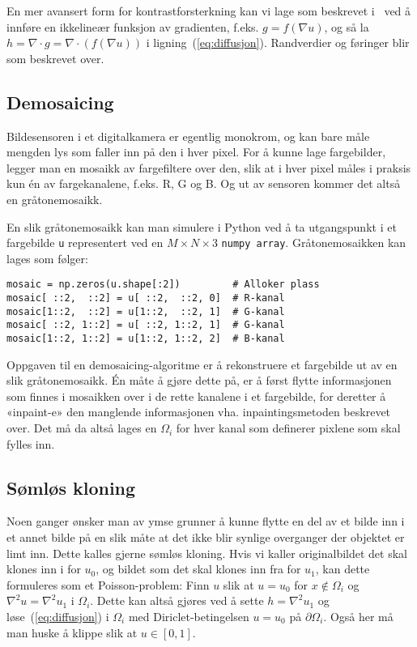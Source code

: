 \documentclass[11pt,a4paper]{article}
\begin{document}
En mer avansert form for kontrastforsterkning kan vi lage som
beskrevet i~\cite{Fattal:02} ved å innføre en ikkelineær funksjon av
gradienten, f.eks. $g = f(\nabla u)$, og så la
$h = \nabla\cdot g = \nabla\cdot(f(\nabla u))$ i
ligning~(\ref{eq:diffusjon}). Randverdier og føringer blir som
beskrevet over.

\subsection{Demosaicing}
\label{sec:utvidelse_1}

Bildesensoren i et digitalkamera er egentlig monokrom, og kan bare
måle mengden lys som faller inn på den i hver pixel. For å kunne lage
fargebilder, legger man en mosaikk av fargefiltere over den, slik at i
hver pixel måles i praksis kun én av fargekanalene, f.eks. R, G og B.
Og ut av sensoren kommer det altså en gråtonemosaikk.

En slik gråtonemosaikk kan man simulere i Python ved å ta utgangspunkt
i et fargebilde \texttt{u} representert ved en $M\times N \times 3$
\texttt{numpy array}. Gråtonemosaikken kan lages som følger:
\begin{lstlisting}
mosaic = np.zeros(u.shape[:2])         # Alloker plass
mosaic[ ::2,  ::2] = u[ ::2,  ::2, 0]  # R-kanal
mosaic[1::2,  ::2] = u[1::2,  ::2, 1]  # G-kanal
mosaic[ ::2, 1::2] = u[ ::2, 1::2, 1]  # G-kanal
mosaic[1::2, 1::2] = u[1::2, 1::2, 2]  # B-kanal
\end{lstlisting}

Oppgaven til en demosaicing-algoritme er å rekonstruere et fargebilde
ut av en slik gråtonemosaikk. Én måte å gjøre dette på, er å først
flytte informasjonen som finnes i mosaikken over i de rette kanalene i
et fargebilde, for deretter å «inpaint-e» den manglende informasjonen
vha. inpaintingsmetoden beskrevet over. Det må da altså lages en
$\Omega_i$ for hver kanal som definerer pixlene som skal fylles inn.

\subsection{Sømløs kloning}

Noen ganger ønsker man av ymse grunner å kunne flytte en del av et
bilde inn i et annet bilde på en slik måte at det ikke blir synlige
overganger der objektet er limt inn. Dette kalles gjerne sømløs
kloning. Hvis vi kaller originalbildet det skal klones inn i for
$u_0$, og bildet som det skal klones inn fra for $u_1$, kan dette
formuleres som et Poisson-problem: Finn $u$ slik at $u = u_0$ for
$x \not\in \Omega_i$ og $\nabla^2 u = \nabla^2 u_1$ i $\Omega_i$.
Dette kan altså gjøres ved å sette $h = \nabla^2 u_1$ og
løse~(\ref{eq:diffusjon}) i $\Omega_i$ med Diriclet-betingelsen
$u = u_0$ på $\partial\Omega_i$. Også her må man huske å klippe slik
at $u \in [0, 1]$.
\end{document}
